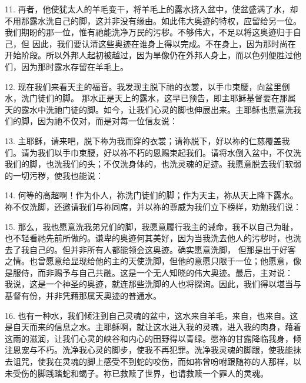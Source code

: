 11. 再者，他使犹太人的羊毛变干，将羊毛上的露水挤入盆中，使盆盛满了水，却不用那露水洗自己的脚，这并非没有缘由。如此伟大奥迹的特权，应留给另一位。我们期盼的那一位，惟有祂能洗净万民的污秽。不够伟大，不足以将这奥迹归于自己，但 因此，我们要认清这些奥迹在谁身上得以完成。不在身上，因为那时尚在开始阶段。所以外邦人起初被越过，因为旱像仍在外邦人身上，而以色列便胜过他们，因为那时露水存留在羊毛上。\par

12. 现在我们来看天主的福音。我发现主脱下祂的衣裳，以手巾束腰，向盆里倒水，洗门徒们的脚。 那水正是天上的露水，这早已预告，即主耶稣基督要在那属天的露水中洗祂门徒的脚。如今，让我们心灵的脚也伸展出来。主耶稣也愿意洗我们的脚，因为祂不仅对，而是对每一位信友说：\par

13. 主耶稣，请来吧，脱下祢为我而穿的衣裳；请祢脱下，好以祢的仁慈覆盖我们。请为我们以手巾束腰，好以祢不朽的恩赐束起我们。请将水倒入盆中，不仅洗我们的脚，也洗我们的头；不仅洗身体的，也洗灵魂的足迹。我愿意脱去我们软弱的一切污秽，使我也能说：\par

14. 何等的高超啊！作为仆人，祢洗门徒们的脚；作为天主，祢从天上降下露水。祢不仅洗脚，还邀请我们与祢同席，并以祢的尊威为我们立下榜样，劝勉我们说：\par

15. 那么，我也愿意洗我弟兄们的脚，我愿意履行我主的诫命，我不以自己为耻，也不轻看祂先前所做的。谦卑的奥迹何其美好，因为当我洗去他人的污秽时，也洗去了我自己的。但并非所有人都能领会这奥迹。确实愿意洗脚， 但那是出于好客之情。也曾愿意给显现给他的主的天使洗脚，但他的意愿只限于一位；他愿意，像是服侍，而非赐予与自己共融。这是一个无人知晓的伟大奥迹。最后，主对说： 我说，这是一个神圣的奥迹，就连那些洗脚的人也将探询。因此，我们得以堪当与基督有份，并非凭藉那属天奥迹的普通水。\par

16. 也有一种水，我们倾注到自己灵魂的盆中，这水来自羊毛，来自，也来自。这是自天而来的信息之水。主耶稣啊，就让这水进入我的灵魂，进入我的肉身，藉着这雨的滋润，让我们心灵的峡谷和内心的田野得以青绿。愿祢的甘露降临我身，倾注恩宠与不朽。洗净我心灵的脚步，使我不再犯罪。洗净我灵魂的脚跟，使我能抹去诅咒，使我在灵魂的脚上感受不到蛇的咬伤，而如祢曾吩咐跟随祢的人那样，以未受伤的脚践踏蛇和蝎子。祢已救赎了世界，也请救赎一个罪人的灵魂。\par

